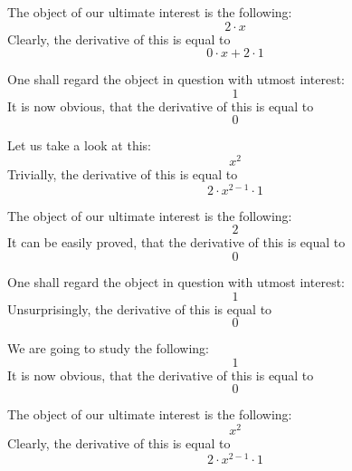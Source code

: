 \documentclass{article}
\begin{document}
The object of our ultimate interest is the following:
\begin{equation}
2 \cdot x 
\end{equation}
Clearly, the derivative of this is equal to
\begin{equation}
0 \cdot x + 2 \cdot 1 
\end{equation}

One shall regard the object in question with utmost interest:
\begin{equation}
1 
\end{equation}
It is now obvious, that the derivative of this is equal to
\begin{equation}
0 
\end{equation}

Let us take a look at this:
\begin{equation}
x ^{2 } 
\end{equation}
Trivially, the derivative of this is equal to
\begin{equation}
2 \cdot x ^{2 - 1 } \cdot 1 
\end{equation}

The object of our ultimate interest is the following:
\begin{equation}
2 
\end{equation}
It can be easily proved, that the derivative of this is equal to
\begin{equation}
0 
\end{equation}

One shall regard the object in question with utmost interest:
\begin{equation}
1 
\end{equation}
Unsurprisingly, the derivative of this is equal to
\begin{equation}
0 
\end{equation}

We are going to study the following:
\begin{equation}
1 
\end{equation}
It is now obvious, that the derivative of this is equal to
\begin{equation}
0 
\end{equation}

The object of our ultimate interest is the following:
\begin{equation}
x ^{2 } 
\end{equation}
Clearly, the derivative of this is equal to
\begin{equation}
2 \cdot x ^{2 - 1 } \cdot 1 
\end{equation}
\end{document}
